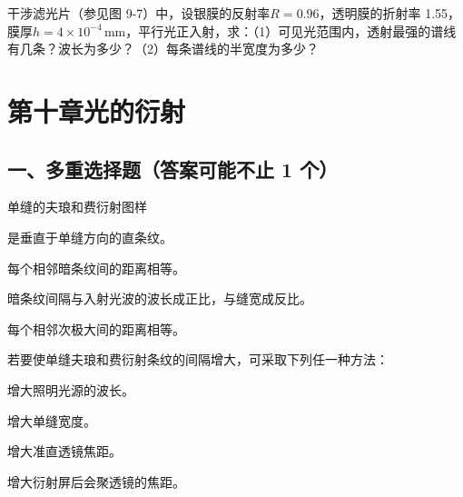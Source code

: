 \documentclass[padl, analysis, notocnum]{ExBook}
\newcommand{\answerarea}[1][3.5cm]{%
  \par\vspace{1mm}%
  \noindent{\color{themeColor!35}\rule{\linewidth}{0.4pt}}\par
  \noindent\begin{minipage}[t][#1][t]{\linewidth}\vspace{0pt}\end{minipage}\par
  \noindent{\color{themeColor!35}\rule{\linewidth}{0.4pt}}\par
}
\begin{document}
\begin{qitems}[startnum=11]
\qitem 干涉滤光片（参见图 9-7）中，设银膜的反射率$R=0.96$，透明膜的折射率 1.55，膜厚$h=4\times 10^{-4}\,\mathrm{mm}$，平行光正入射，求：（1）可见光范围内，透射最强的谱线有几条？波长为多少？（2）每条谱线的半宽度为多少？
\label{q:258:start}
\answerarea[7.0cm]
\label{q:258:end}
\end{qitems}

\section{第十章\quad 光的衍射}
\subsection{一、多重选择题（答案可能不止 1 个）}
\begin{qitems}[startnum=1]
\qitem 单缝的夫琅和费衍射图样
\par\noindent\hspace{2em}是垂直于单缝方向的直条纹。
\par\noindent\hspace{2em}每个相邻暗条纹间的距离相等。
\par\noindent\hspace{2em}暗条纹间隔与入射光波的波长成正比，与缝宽成反比。
\par\noindent\hspace{2em}每个相邻次极大间的距离相等。
\label{q:259:start}
\answerarea[4.0cm]
\label{q:259:end}
\end{qitems}

\begin{qitems}[startnum=2]
\qitem 若要使单缝夫琅和费衍射条纹的间隔增大，可采取下列任一种方法：
\par\noindent\hspace{2em}增大照明光源的波长。
\par\noindent\hspace{2em}增大单缝宽度。
\par\noindent\hspace{2em}增大准直透镜焦距。
\par\noindent\hspace{2em}增大衍射屏后会聚透镜的焦距。
\label{q:260:start}
\answerarea[4.0cm]
\label{q:260:end}
\end{qitems}
\end{document}
